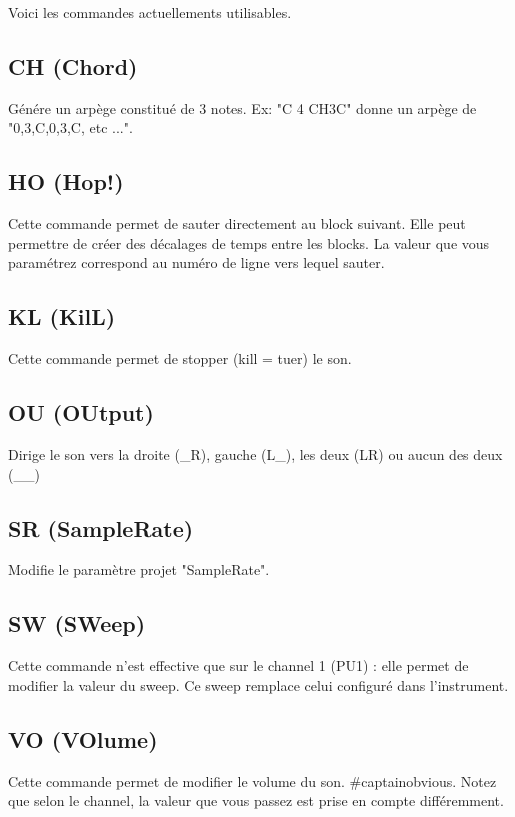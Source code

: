
Voici les commandes actuellements utilisables.

\subsection{CH (Chord)}

Génére un arpège constitué de 3 notes. Ex: "C 4 CH3C" donne un arpège de "0,3,C,0,3,C, etc ...".

\subsection{HO (Hop!)}

Cette commande permet de sauter directement au block suivant.
Elle peut permettre de créer des décalages de temps entre les blocks.
La valeur que vous paramétrez correspond au numéro de ligne vers lequel sauter.

\subsection{KL (KilL)}

Cette commande permet de stopper (kill = tuer) le son.


\subsection{OU (OUtput)}

Dirige le son vers la droite (\_R), gauche (L\_), les deux (LR) ou aucun des deux (\_\_)

\subsection{SR (SampleRate)}

Modifie le paramètre projet "SampleRate".

\subsection{SW (SWeep)}

Cette commande n'est effective que sur le channel 1 (PU1) : elle permet de modifier la valeur du sweep.
Ce sweep remplace celui configuré dans l'instrument.

\subsection{VO (VOlume)}

Cette commande permet de modifier le volume du son.
\#captainobvious.
Notez que selon le channel, la valeur que vous passez est prise en compte différemment.
